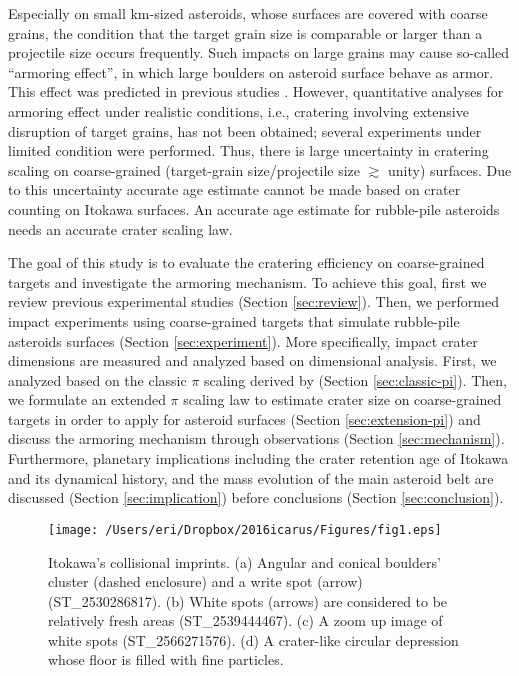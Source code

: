 \documentclass[3p,authoryear]{elsarticle}
\begin{document}
Especially on small km-sized asteroids, whose surfaces are covered with coarse grains, the condition that the target grain size is comparable or larger than a projectile size occurs frequently. Such impacts on large grains may cause so-called ``armoring effect'', in which large boulders on asteroid surface behave as armor.
This effect was predicted in previous studies \citep[e.g.,][]{barnouin2005, guettler2012}.
However, quantitative analyses for armoring effect under realistic conditions, i.e., cratering involving extensive disruption of target grains, has not been obtained; several experiments under limited condition were performed.
Thus, there is large uncertainty in cratering scaling on coarse-grained (target-grain size/projectile size $\gtrsim $ unity) surfaces. Due to this uncertainty accurate age estimate cannot be made based on crater counting on Itokawa surfaces. An accurate age estimate for rubble-pile asteroids needs an accurate crater scaling law.

The goal of this study is to evaluate the cratering efficiency on coarse-grained targets and investigate the armoring mechanism.
To achieve this goal, first we review previous experimental studies (Section \ref{sec:review}). Then, we performed impact experiments using coarse-grained targets that simulate rubble-pile asteroids surfaces (Section \ref{sec:experiment}).
More specifically, impact crater dimensions are measured and analyzed based on dimensional analysis.
First, we analyzed based on the classic $\pi$ scaling derived by \citet{holsapple1993} (Section \ref{sec:classic-pi}).
Then, we formulate an extended $\pi$ scaling law to estimate crater size on coarse-grained targets in order to apply for asteroid surfaces (Section \ref{sec:extension-pi}) and discuss the armoring mechanism through observations (Section \ref{sec:mechanism}).
Furthermore, planetary implications including the crater retention age of Itokawa and its dynamical history, and the mass evolution of the main asteroid belt are discussed (Section \ref{sec:implication}) before conclusions (Section \ref{sec:conclusion}).

\begin{figure*}[tbp]
	\begin{center}
	\texttt{[image: /Users/eri/Dropbox/2016icarus/Figures/fig1.eps]}
	\caption{Itokawa's collisional imprints. (a) Angular and conical boulders' cluster (dashed enclosure) and a write spot (arrow) (ST{\_}2530286817). (b) White spots (arrows) are considered to be relatively fresh areas (ST{\_}2539444467). (c) A zoom up image of white spots (ST{\_}2566271576). (d) A crater-like circular depression whose floor is filled with fine particles. \citep{nakamura2008,hirata2009}}
	\label{amica}
	\end{center}
\end{figure*}
\end{document}
